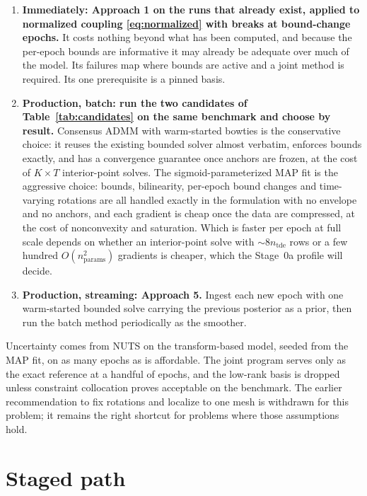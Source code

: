\documentclass[11pt]{article}
\begin{document}
\begin{enumerate}
\item \textbf{Immediately: Approach 1 on the runs that already exist, applied to normalized coupling \eqref{eq:normalized} with breaks at bound-change epochs.} It costs nothing beyond what has been computed, and because the per-epoch bounds are informative it may already be adequate over much of the model. Its failures map where bounds are active and a joint method is required. Its one prerequisite is a pinned basis.

\item \textbf{Production, batch: run the two candidates of Table~\ref{tab:candidates} on the same benchmark and choose by result.} Consensus ADMM with warm-started bowties is the conservative choice: it reuses the existing bounded solver almost verbatim, enforces bounds exactly, and has a convergence guarantee once anchors are frozen, at the cost of $K \times T$ interior-point solves. The sigmoid-parameterized MAP fit is the aggressive choice: bounds, bilinearity, per-epoch bound changes and time-varying rotations are all handled exactly in the formulation with no envelope and no anchors, and each gradient is cheap once the data are compressed, at the cost of nonconvexity and saturation. Which is faster per epoch at full scale depends on whether an interior-point solve with $\sim 8 n_{\mathrm{tde}}$ rows or a few hundred $O(n_{\mathrm{params}}^2)$ gradients is cheaper, which the Stage~0a profile will decide.

\item \textbf{Production, streaming: Approach 5.} Ingest each new epoch with one warm-started bounded solve carrying the previous posterior as a prior, then run the batch method periodically as the smoother.
\end{enumerate}

Uncertainty comes from NUTS on the transform-based model, seeded from the MAP fit, on as many epochs as is affordable. The joint program serves only as the exact reference at a handful of epochs, and the low-rank basis is dropped unless constraint collocation proves acceptable on the benchmark. The earlier recommendation to fix rotations and localize to one mesh is withdrawn for this problem; it remains the right shortcut for problems where those assumptions hold.

\section{Staged path}
\end{document}

